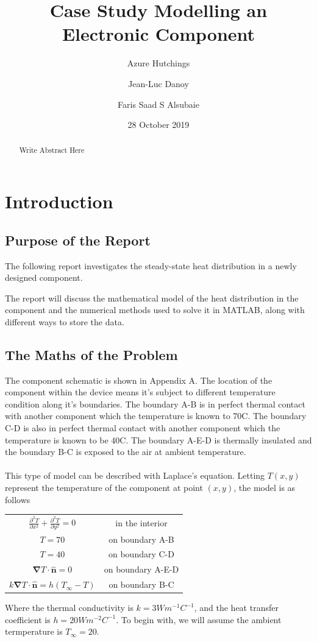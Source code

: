 \documentclass[12pt,a4paper]{article}
\title{Case Study Modelling an Electronic Component}
\author{
  Azure Hutchings
  \and
  Jean-Luc Danoy
  \and
  Faris Saad S Alsubaie
}
\date{28 October 2019}
\begin{document}
 
\begin{titlepage}
\maketitle
\end{titlepage}

\renewcommand{\abstractname}{Executive Summary}
\begin{abstract}
Write Abstract Here
\end{abstract}

\pagebreak

\tableofcontents

\pagebreak

\section{Introduction}

\subsection{Purpose of the Report}
The following report investigates the steady-state heat distribution in a newly designed component. 

The report will discuss the mathematical model of the heat distribution in the component and the numerical methods used to solve it in MATLAB, along with different ways to store the data.

\subsection{The Maths of the Problem}
The component schematic is shown in Appendix A. The location of the component within the device means it's subject to different temperature condition along it's boundaries. The boundary A-B is in perfect thermal contact with another component which the temperature is known to 70\degree C. The boundary C-D is also in perfect thermal contact with another component which the temperature is known to be 40\degree C. The boundary A-E-D is thermally insulated and the boundary B-C is exposed to the air at ambient temperature.
\\\\
This type of model can be described with Laplace's equation. Letting $T(x,y)$ represent the temperature of the component at point $(x, y)$, the model is as follows	

\begin{center}
\begin{tabular}{c c}
$\frac{\partial^2 T}{\partial x^2}+\frac{\partial^2 T}{\partial y^2}=0$ & in the interior\\
$T = 70$ & on boundary A-B \\
$T = 40$ & on boundary C-D \\
$\boldsymbol{\nabla} T \cdot {\hat{\textbf{n}}} = 0$ & on boundary A-E-D\\
$k\boldsymbol{\nabla}T\cdot\hat{\textbf{n}} = h(T_{\infty} - T)$ & on boundary B-C
\end{tabular}
\end{center}
Where the thermal conductivity is $k=3Wm^{-1}C^{-1}$, and the heat transfer coefficient is $h=20 Wm^{-2}C^{-1}$. To begin with, we will assume the ambient termperature is $T_\infty = 20$.
\end{document}
